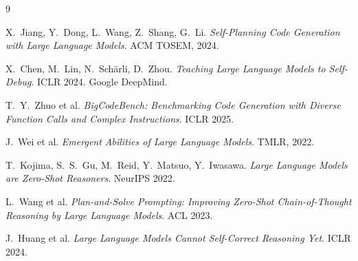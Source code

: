 \documentclass[11pt,twocolumn]{article}
\begin{document}

\begin{thebibliography}{9}

  X.~Jiang, Y.~Dong, L.~Wang, Z.~Shang, G.~Li.
  \textit{Self-Planning Code Generation with Large Language Models}.
  ACM TOSEM, 2024.

  X.~Chen, M.~Lin, N.~Sch\"{a}rli, D.~Zhou.
  \textit{Teaching Large Language Models to Self-Debug}.
  ICLR 2024. Google DeepMind.

  T.~Y.~Zhuo et al.
  \textit{BigCodeBench: Benchmarking Code Generation with Diverse Function
  Calls and Complex Instructions}.
  ICLR 2025.

  J.~Wei et al.
  \textit{Emergent Abilities of Large Language Models}.
  TMLR, 2022.

  T.~Kojima, S.~S.~Gu, M.~Reid, Y.~Matsuo, Y.~Iwasawa.
  \textit{Large Language Models are Zero-Shot Reasoners}.
  NeurIPS 2022.

  L.~Wang et al.
  \textit{Plan-and-Solve Prompting: Improving Zero-Shot Chain-of-Thought
  Reasoning by Large Language Models}.
  ACL 2023.

  J.~Huang et al.
  \textit{Large Language Models Cannot Self-Correct Reasoning Yet}.
  ICLR 2024.

\end{thebibliography}
\end{document}
